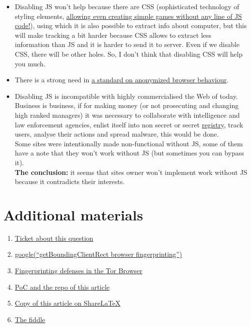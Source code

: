 \documentclass[letterpaper,14pt]{article}
\begin{document}
\begin{itemize}
\item
  Disabling JS won't help because there are CSS (sophisticated technology of styling elements, \href{https://github.com/i0z/nojsgame}{allowing even creating simple games without any line of JS code!}), using which it is also possible to extract info about computer, but this will make tracking a bit harder because CSS allows to extract less information than JS and it is harder to send it to server. Even if we disable CSS, there will be other holes. So, I don't think that disabling CSS will help you much.
\item
  There is a strong need in \href{https://trac.torproject.org/projects/tor/ticket/14310}{a standard on anonymized browser behaviour}.
\item
  Disabling JS is incompatible with highly commercialised the Web of today.\\
  Business is business, if for making money (or not prosecuting and changing high ranked managers) it was necessary to collaborate with intelligence and law enforcement agencies, enlist itself into non secret or secret \href{http://97-fz.rkn.gov.ru/}{registry}, track users, analyse their actions and spread malware, this would be done.\\
  Some sites were intentionally made non-functional without JS, some of them have a note that they won't work without JS (but sometimes you can bypass it).\\
  \textbf{The conclusion:} it seems that sites owner won't implement work without JS because it contradicts their interests.
\end{itemize}

\section{Additional materials}\label{additional-materials}

\begin{enumerate}
\itemsep1pt\parskip0pt
\item
  \href{https://trac.torproject.org/projects/tor/ticket/13400}{Ticket
  about this question}
\item
  \href{https://www.google.com/search?num=100\&newwindow=1\&q=getBoundingClientRect+browser+fingerprinting}{google(``getBoundingClientRect
  browser fingerprinting'')}
\item
  \href{https://www.torproject.org/projects/torbrowser/design/\#fingerprinting-defenses}{Fingerprinting
  defenses in the Tor Browser}
\item
  \href{https://github.com/KOLANICH/Article-2015-Dull-captaincy-or-the-way-Tor-Project-fights-browser-fingerprinting}{PoC and the repo of this article}
\item
  \href{https://www.sharelatex.com/github/repos/KOLANICH/Article-2015-Dull-captaincy-or-the-way-Tor-Project-fights-browser-fingerprinting}{Copy of this article on Share\LaTeX}
\item
  \href{http://jsfiddle.net/fyw4qmdg/5/}{The fiddle}
\end{enumerate}
\end{document}
